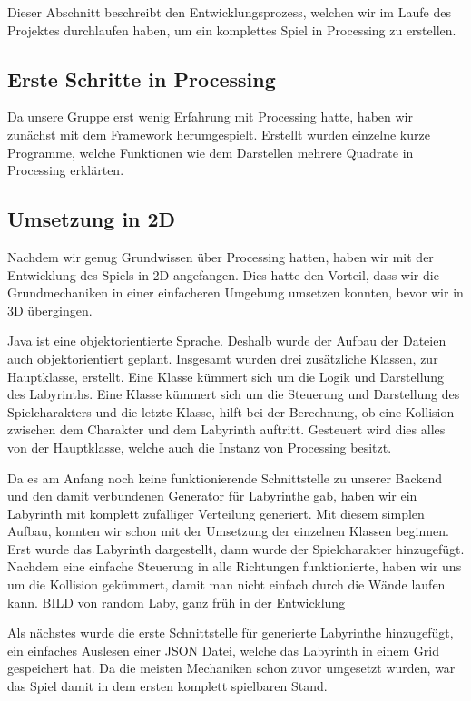 Dieser Abschnitt beschreibt den Entwicklungsprozess, welchen wir im Laufe des Projektes durchlaufen haben, um ein komplettes Spiel in Processing zu erstellen.

\subsection{Erste Schritte in Processing}\label{subsec:erste-schritte}
Da unsere Gruppe erst wenig Erfahrung mit Processing hatte, haben wir zunächst mit dem Framework herumgespielt. Erstellt wurden einzelne kurze Programme, welche Funktionen wie dem Darstellen mehrere Quadrate in Processing erklärten.

\subsection{Umsetzung in 2D}\label{subsec:umsetzung-in-2D}
Nachdem wir genug Grundwissen über Processing hatten, haben wir mit der Entwicklung des Spiels in 2D angefangen. Dies hatte den Vorteil, dass wir die Grundmechaniken in einer einfacheren Umgebung umsetzen konnten, bevor wir in 3D übergingen.

Java ist eine objektorientierte Sprache. Deshalb wurde der Aufbau der Dateien auch objektorientiert geplant. Insgesamt wurden drei zusätzliche Klassen, zur Hauptklasse, erstellt. Eine Klasse kümmert sich um die Logik und Darstellung des Labyrinths. Eine Klasse kümmert sich um die Steuerung und Darstellung des Spielcharakters und die letzte Klasse, hilft bei der Berechnung, ob eine Kollision zwischen dem Charakter und dem Labyrinth auftritt. Gesteuert wird dies alles von der Hauptklasse, welche auch die Instanz von Processing besitzt.

Da es am Anfang noch keine funktionierende Schnittstelle zu unserer Backend und den damit verbundenen Generator für Labyrinthe gab, haben wir ein Labyrinth mit komplett zufälliger Verteilung generiert.
Mit diesem simplen Aufbau, konnten wir schon mit der Umsetzung der einzelnen Klassen beginnen. Erst wurde das Labyrinth dargestellt, dann wurde der Spielcharakter hinzugefügt. Nachdem eine einfache Steuerung in alle Richtungen funktionierte, haben wir uns um die Kollision gekümmert, damit man nicht einfach durch die Wände laufen kann.
\newline BILD von random Laby, ganz früh in der Entwicklung \newline

Als nächstes wurde die erste Schnittstelle für generierte Labyrinthe hinzugefügt, ein einfaches Auslesen einer JSON Datei, welche das Labyrinth in einem Grid gespeichert hat. 
Da die meisten Mechaniken schon zuvor umgesetzt wurden, war das Spiel damit in dem ersten komplett spielbaren Stand.

